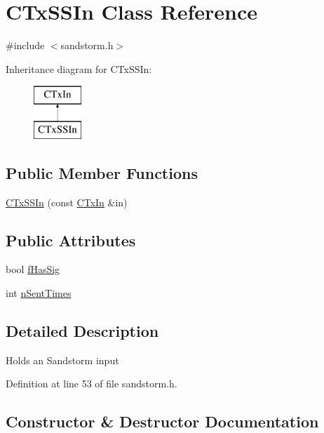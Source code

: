 \hypertarget{class_c_tx_s_s_in}{}\section{C\+Tx\+S\+S\+In Class Reference}
\label{class_c_tx_s_s_in}


{\ttfamily \#include $<$sandstorm.\+h$>$}

Inheritance diagram for C\+Tx\+S\+S\+In\+:\begin{figure}[H]
\begin{center}
\leavevmode
\includegraphics[height=2.000000cm]{class_c_tx_s_s_in}
\end{center}
\end{figure}
\subsection*{Public Member Functions}
\begin{DoxyCompactItemize}
\item 
\hyperlink{class_c_tx_s_s_in_a084ac187363e1511b526621300a352b5}{C\+Tx\+S\+S\+In} (const \hyperlink{class_c_tx_in}{C\+Tx\+In} \&in)
\end{DoxyCompactItemize}
\subsection*{Public Attributes}
\begin{DoxyCompactItemize}
\item 
bool \hyperlink{class_c_tx_s_s_in_a0e09e06a90cee14abdbd390f3ecbfe08}{f\+Has\+Sig}
\item 
int \hyperlink{class_c_tx_s_s_in_a1e4cb4930ca28196efe956ddc3310b28}{n\+Sent\+Times}
\end{DoxyCompactItemize}


\subsection{Detailed Description}
Holds an Sandstorm input 

Definition at line 53 of file sandstorm.\+h.



\subsection{Constructor \& Destructor Documentation}
\hypertarget{class_c_tx_s_s_in_a084ac187363e1511b526621300a352b5}{}
